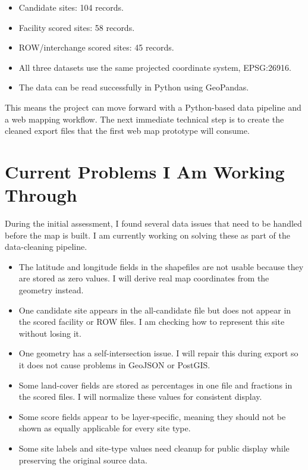 \documentclass[10pt]{article}
\begin{document}
\begin{itemize}
  \item Candidate sites: 104 records.
  \item Facility scored sites: 58 records.
  \item ROW/interchange scored sites: 45 records.
  \item All three datasets use the same projected coordinate system, EPSG:26916.
  \item The data can be read successfully in Python using GeoPandas.
\end{itemize}

This means the project can move forward with a Python-based data pipeline and a
web mapping workflow. The next immediate technical step is to create the cleaned
export files that the first web map prototype will consume.

\section{Current Problems I Am Working Through}

During the initial assessment, I found several data issues that need to be handled
before the map is built. I am currently working on solving these as part of the
data-cleaning pipeline.

\begin{itemize}
  \item The latitude and longitude fields in the shapefiles are not usable because they are stored as zero values. I will derive real map coordinates from the geometry instead.
  \item One candidate site appears in the all-candidate file but does not appear in the scored facility or ROW files. I am checking how to represent this site without losing it.
  \item One geometry has a self-intersection issue. I will repair this during export so it does not cause problems in GeoJSON or PostGIS.
  \item Some land-cover fields are stored as percentages in one file and fractions in the scored files. I will normalize these values for consistent display.
  \item Some score fields appear to be layer-specific, meaning they should not be shown as equally applicable for every site type.
  \item Some site labels and site-type values need cleanup for public display while preserving the original source data.
\end{itemize}
\end{document}
